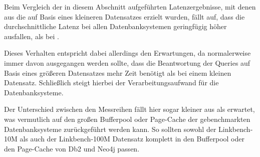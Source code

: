 \begin{table}[!h]
\centering
{}
\caption{Latenz Linkbench-100M-Const Neo4j}
\label{tab:latenz_100m_const:neo4j}
\end{table}

Beim Vergleich der in diesem Abschnitt aufgeführten Latenzergebnisse, mit denen aus  die auf Basis eines kleineren Datensatzes erzielt wurden, fällt auf, dass die durchschnittliche Latenz bei allen Datenbanksystemen geringfügig höher ausfallen, als bei . 

Dieses Verhalten entspricht dabei allerdings den Erwartungen, da normalerweise immer davon ausgegangen werden sollte, dass die Beantwortung der Queries auf Basis eines größeren Datensatzes mehr Zeit benötigt als bei einem kleinen Datensatz. Schließlich steigt hierbei der Verarbeitungsaufwand für die Datenbanksysteme. 

Der Unterschied zwischen den Messreihen fällt hier sogar kleiner aus als erwartet, was vermutlich auf den großen Bufferpool oder Page-Cache der gebenchmarkten Datenbanksysteme zurückgeführt werden kann. So sollten sowohl der Linkbench-10M als auch der Linkbench-100M Datensatz komplett in den Bufferpool oder den Page-Cache von Db2 und Neo4j passen. 

